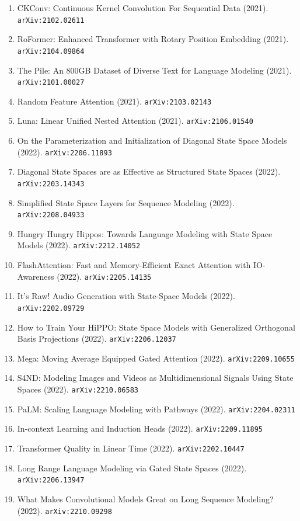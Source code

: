 \documentclass[11pt]{article}
\begin{document}
\begin{enumerate}
  \item CKConv: Continuous Kernel Convolution For Sequential Data (2021). \texttt{arXiv:2102.02611}
  \item RoFormer: Enhanced Transformer with Rotary Position Embedding (2021). \texttt{arXiv:2104.09864}
  \item The Pile: An 800GB Dataset of Diverse Text for Language Modeling (2021). \texttt{arXiv:2101.00027}
  \item Random Feature Attention (2021). \texttt{arXiv:2103.02143}
  \item Luna: Linear Unified Nested Attention (2021). \texttt{arXiv:2106.01540}
  \item On the Parameterization and Initialization of Diagonal State Space
  Models (2022). \texttt{arXiv:2206.11893}
  \item Diagonal State Spaces are as Effective as Structured State Spaces (2022). \texttt{arXiv:2203.14343}
  \item Simplified State Space Layers for Sequence Modeling (2022). \texttt{arXiv:2208.04933}
  \item Hungry Hungry Hippos: Towards Language Modeling with State Space Models (2022). \texttt{arXiv:2212.14052}
  \item FlashAttention: Fast and Memory-Efficient Exact Attention with
  IO-Awareness (2022). \texttt{arXiv:2205.14135}
  \item It's Raw! Audio Generation with State-Space Models (2022). \texttt{arXiv:2202.09729}
  \item How to Train Your HiPPO: State Space Models with Generalized Orthogonal
  Basis Projections (2022). \texttt{arXiv:2206.12037}
  \item Mega: Moving Average Equipped Gated Attention (2022). \texttt{arXiv:2209.10655}
  \item S4ND: Modeling Images and Videos as Multidimensional Signals Using State
  Spaces (2022). \texttt{arXiv:2210.06583}
  \item PaLM: Scaling Language Modeling with Pathways (2022). \texttt{arXiv:2204.02311}
  \item In-context Learning and Induction Heads (2022). \texttt{arXiv:2209.11895}
  \item Transformer Quality in Linear Time (2022). \texttt{arXiv:2202.10447}
  \item Long Range Language Modeling via Gated State Spaces (2022). \texttt{arXiv:2206.13947}
  \item What Makes Convolutional Models Great on Long Sequence Modeling? (2022). \texttt{arXiv:2210.09298}

\end{enumerate}
\end{document}

